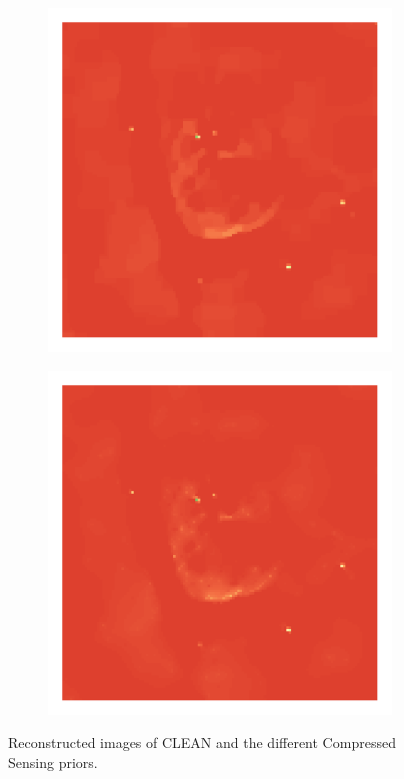 \begin{figure}[h]
\begin{subfigure}[b]{0.24\linewidth}
	\end{subfigure}
	\begin{subfigure}[b]{0.24\linewidth}
		\includegraphics[width=\linewidth, trim={18px 19px 18px 18px}, clip]{./chapters/05.results/g55/TV_model.png}
	\end{subfigure}
	\begin{subfigure}[b]{0.24\linewidth}
		\includegraphics[width=\linewidth, trim={18px 19px 18px 18px}, clip]{./chapters/05.results/g55/starlets3_model.png}
	\end{subfigure}
	\caption{Reconstructed images of CLEAN and the different Compressed Sensing priors.} 
	\label{res:g55:img}
\end{figure}

